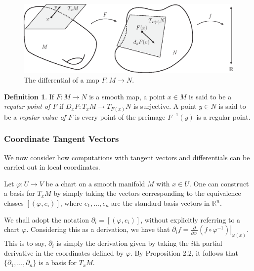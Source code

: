\documentclass[12pt,a4paper]{article}
\numberwithin{equation}{section}
\theoremstyle{definition}
\newtheorem{definition}{Definition}[section]
\theoremstyle{remark}
\begin{document}
\begin{figure}[h!]
\centering
\includegraphics[scale=0.75]{fig/differential-1b}
\caption{The differential of a map $F:M\to N$.}
\label{fig:diff-1}
\end{figure}
\begin{definition}
If $F:M\to N$ is a smooth map, a point $x\in M$ is said to be a \textit{regular point of $F$} if $D_xF:T_xM\to T_{F(x)}N$ is surjective. A point $y\in N$ is said to be a \textit{regular value of $F$} is every point of the preimage $F^{-1}(y)$ is a regular point.
\end{definition}
\subsubsection{Coordinate Tangent Vectors}
We now consider how computations with tangent vectors and differentials can be carried out in local coordinates.

Let $\varphi:U\to V$ be a chart on a smooth manifold $M$ with $x\in U$. One can construct a basis for $T_xM$ by simply taking the vectors corresponding to the equivalence classes $[(\varphi,e_i)]$, where $e_1,\ldots,e_n$ are the standard basis vectors in $\mathbb{R}^n$. 

We shall adopt the notation $\partial_i=[(\varphi,e_i)]$, without explicitly referring to a chart $\varphi$. Considering this as a derivation, we have that $\partial_if=\left.\frac{\partial}{\partial x^i}(f\circ\varphi^{-1})\right\rvert_{\varphi(x)}$. This is to say, $\partial_i$ is simply the derivation given by taking the $i$th partial derivative in the coordinates defined by $\varphi$. By Proposition 2.2, it follows that $\{\partial_1,\ldots,\partial_n\}$ is a basis for $T_xM$.
\end{document}

